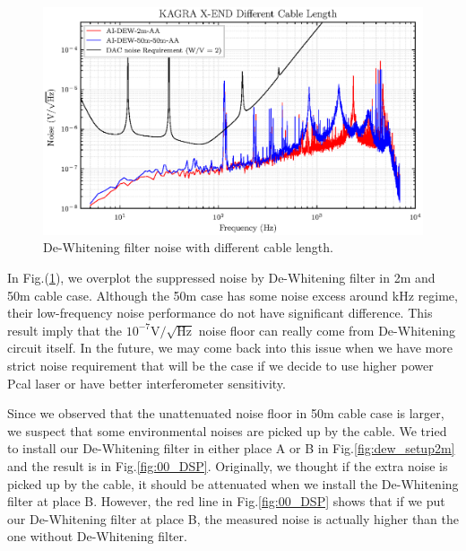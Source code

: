 \begin{figure}[hbt!]
\centering
\includegraphics[width=1\textwidth]{figure/noise/00_bothm}
\caption[De-Whitening filter noise with different cable length]{ De-Whitening filter noise with different cable length. }
\label{fig:00_bothm}
\end{figure}



In Fig.(\ref{fig:00_bothm}), we overplot the suppressed noise by De-Whitening filter in 2m and 50m cable case. Although the 50m case has some noise excess around kHz regime, their low-frequency noise performance do not have significant difference. This result imply that the $10^{-7}\mathrm{V}/\sqrt{\mathrm{Hz}}$ noise floor can really come from De-Whitening circuit itself. In the future, we may come back into this issue when we have more strict noise requirement that will be the case if we decide to use higher power Pcal laser or have better interferometer sensitivity.

Since we observed that the unattenuated noise floor in 50m cable case is larger, we suspect that some environmental noises are picked up by the cable. We tried to install our De-Whitening filter in either place A or B in Fig.\ref{fig:dew_setup2m} and the result is in Fig.\ref{fig:00_DSP}. Originally, we thought if the extra noise is picked up by the cable, it should be attenuated when we install the De-Whitening filter at place B. However, the red line in Fig.\ref{fig:00_DSP} shows that if we put our De-Whitening filter at place B, the measured noise is actually higher than the one without De-Whitening filter. 


